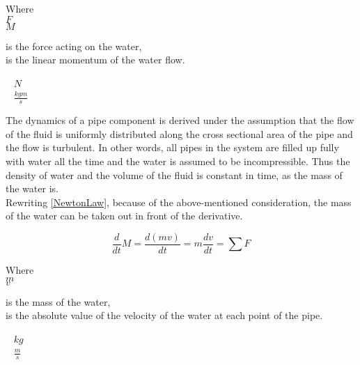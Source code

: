 \begin{minipage}[t]{0.20\textwidth}
Where\\
\hspace*{8mm} $F$ \\
\hspace*{8mm} $M$ 
\end{minipage}
\begin{minipage}[t]{0.68\textwidth}
\vspace*{2mm}
is the force acting on the water,\\
is the linear momentum of the water flow.

\end{minipage}
\begin{minipage}[t]{0.10\textwidth}
\vspace*{2mm}
\textcolor{White}{te}$\unit{N}$\\
\textcolor{White}{te}$\unit{\frac{kgm}{s}}$
\end{minipage}

The dynamics of a pipe component is derived under the assumption that the flow of the fluid is uniformly distributed along the cross sectional area of the pipe and the flow is turbulent. In other words, all pipes in the system are filled up fully with water all the time and the water is assumed to be incompressible. Thus the density of water and the volume of the fluid is constant in time, as the mass of the water is.
\\
Rewriting \eqref{NewtonLaw}, because of the above-mentioned consideration, the mass of the water can be taken out in front of the derivative.

\begin{equation}
  \frac{d}{dt} M = {\frac{d(m v)}{dt}} = m \frac{dv}{dt} = \sum F
\end{equation} 

\begin{minipage}[t]{0.20\textwidth}
Where\\
\hspace*{8mm} $m$ \\
\hspace*{8mm} $v$ 
\end{minipage}
\begin{minipage}[t]{0.68\textwidth}
\vspace*{2mm}
is the mass of the water,\\
is the absolute value of the velocity of the water at each point of the pipe.

\end{minipage}
\begin{minipage}[t]{0.10\textwidth}
\vspace*{2mm}
\textcolor{White}{te}$\unit{kg}$\\
\textcolor{White}{te}$\unit{\frac{m}{s}}$
\end{minipage}

